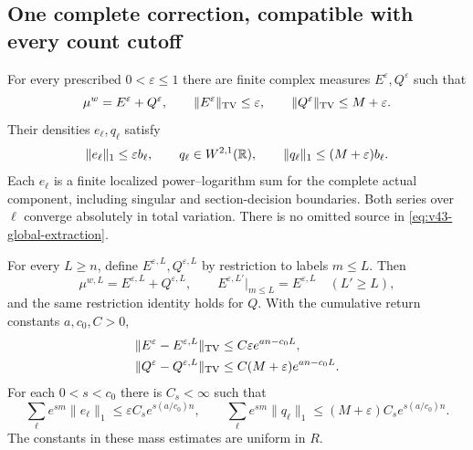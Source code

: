 \subsection{One complete correction, compatible with every count cutoff}
\begin{theorem}
\label{thm:v43-complete-correction}
For every prescribed $0<\varepsilon\le1$ there are finite complex
measures $E^\varepsilon,Q^\varepsilon$ such that
\begin{equation}\label{eq:v43-global-extraction}
 \mu^w=E^\varepsilon+Q^\varepsilon,\qquad
 \|E^\varepsilon\|_{\TV}\le\varepsilon,\qquad
 \|Q^\varepsilon\|_{\TV}\le M+\varepsilon.
\end{equation}
Their densities $e_\ell,q_\ell$ satisfy
\begin{equation}\label{eq:v43-component-budgets}
 \|e_\ell\|_1\le\varepsilon b_\ell,\qquad
 q_\ell\in W^{2,1}(\R),\qquad
 \|q_\ell\|_1\le(M+\varepsilon)b_\ell.
\end{equation}
Each $e_\ell$ is a finite localized power--logarithm sum for the
complete actual component, including singular and section-decision
boundaries. Both series over $\ell$ converge absolutely in total
variation. There is no omitted source in \eqref{eq:v43-global-extraction}.

For every $L\ge n$, define $E^{\varepsilon,L},Q^{\varepsilon,L}$ by
restriction to labels $m\le L$. Then
\begin{equation}\label{eq:v43-projective-compatibility}
 \mu^{w,L}=E^{\varepsilon,L}+Q^{\varepsilon,L},\qquad
 E^{\varepsilon,L'}|_{m\le L}=E^{\varepsilon,L}\quad(L'\ge L),
\end{equation}
and the same restriction identity holds for $Q$. With the cumulative
return constants $a,c_0,C>0$,
\begin{align}
 \|E^\varepsilon-E^{\varepsilon,L}\|_{\TV}
       &\le C\varepsilon e^{an-c_0L},\notag\\
 \|Q^\varepsilon-Q^{\varepsilon,L}\|_{\TV}
       &\le C(M+\varepsilon)e^{an-c_0L}.
                                      \label{eq:v43-correction-count-tail}
\end{align}
For each $0<s<c_0$ there is $C_s<\infty$ such that
\begin{equation}\label{eq:v43-correction-exponential-moment}
 \sum_\ell e^{sm}\|e_\ell\|_1
      \le\varepsilon C_s e^{s(a/c_0)n},\qquad
 \sum_\ell e^{sm}\|q_\ell\|_1
      \le(M+\varepsilon)C_s e^{s(a/c_0)n}.
\end{equation}
The constants in these mass estimates are uniform in $R$.
\end{theorem}
